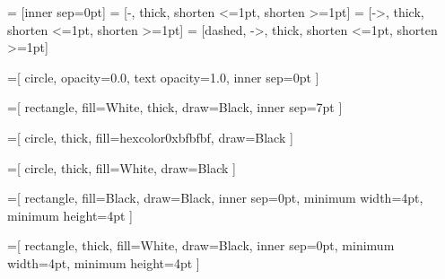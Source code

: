 \usepackage{tikz}
\usetikzlibrary{bayesnet}



\tikzset{>=latex}
   = [inner sep=0pt]
   = [-,
                      thick,
                      shorten <=1pt,
                      shorten >=1pt]
  = [->,
                      thick,
                      shorten <=1pt,
                      shorten >=1pt]
 = [dashed,
                      ->,
                      thick,
                      shorten <=1pt,
                      shorten >=1pt]

=[
                   circle,
                   opacity=0.0,
                   text opacity=1.0,
                   inner sep=0pt
                  ]

=[
                 rectangle,
                 fill=White,
                 thick,
                 draw=Black,
                 inner sep=7pt
                ]

=[
                    circle,
                    thick,
                    fill=hexcolor0xbfbfbf,
                    draw=Black
                   ]

=[
                    circle,
                    thick,
                    fill=White,
                    draw=Black
                   ]

=[
                   rectangle,
                   fill=Black,
                   draw=Black,
                   inner sep=0pt,
                   minimum width=4pt,
                   minimum height=4pt
                  ]

=[
                         rectangle,
                         thick,
                         fill=White,
                         draw=Black,
                         inner sep=0pt,
                         minimum
                         width=4pt,
                         minimum height=4pt
                        ]

\usepackage{pgfplots}                               %
\pgfplotsset{compat=newest}
\pgfplotsset{plot coordinates/math parser=false}
